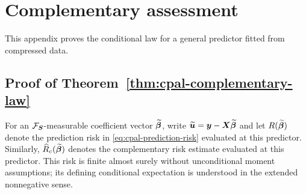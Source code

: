\documentclass{article}
\theoremstyle{plain} %
\theoremstyle{definition} %
\theoremstyle{definition} %
\begin{document}
% 
% 

\clearpage
\section{Complementary assessment}
\label{app:overparameterized-proofs}

This appendix proves the conditional law for a general predictor fitted
from compressed data.

\subsection{Proof of Theorem~\ref{thm:cpal-complementary-law}}
\label{app:proof-complementary-validation}

For an ${\mathcal F}_{\boldsymbol{S}}$-measurable coefficient vector
$\widetilde{\boldsymbol{\beta}}$, write
$\widetilde{\boldsymbol{u}}=\boldsymbol{y}-\boldsymbol{X}\widetilde{\boldsymbol{\beta}}$ and let
$R(\widetilde{\boldsymbol{\beta}})$ denote the prediction risk in
\eqref{eq:cpal-prediction-risk} evaluated at this predictor.
Similarly, $\widehat R_c(\widetilde{\boldsymbol{\beta}})$ denotes the complementary
risk estimate evaluated at this predictor.
This risk is finite almost surely without unconditional moment
assumptions; its defining conditional expectation is understood in the
extended nonnegative sense.
\end{document}
